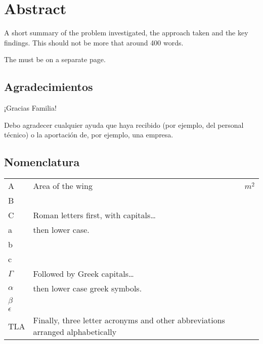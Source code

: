 \documentclass[a4paper,oneside,12pt]{book}
\title{\thesistitle}
\author{\authorname}
\begin{document}


\chapter*{Abstract}
A short summary of the problem investigated, the approach taken and the key findings. This should not be more that around 400 words.

The must be on a separate page.


\newpage

\section*{\Huge{Agradecimientos}}
¡Gracias Familia!

Debo agradecer cualquier ayuda que haya recibido (por ejemplo, del personal técnico) o la aportación de, por ejemplo, una empresa.

\renewcommand*\contentsname{Contenido}
\renewcommand{\listfigurename}{Lista de Figuras}
\renewcommand{\listtablename}{Lista de Tablas}
\tableofcontents
\listoffigures
\listoftables
\newpage
\section*{\Huge{Nomenclatura}}
\begin{tabular}{lp{9cm}l}
A&Area of the wing&$m^{2}$\\
B\\
C& Roman letters first, with capitals\ldots\\
a&then lower case.\\
b\\
c\\
$\Gamma$&Followed by Greek capitals\ldots\\
$\alpha$&then lower case greek symbols.\\
$\beta$\\
$\epsilon$\\
TLA&Finally, three letter acronyms and other abbreviations arranged alphabetically\\
\end{tabular}
\vspace{2cm}

\mainmatter
%





\renewcommand{\bibname}{Referencias Bibliográficas}

\appendix
\renewcommand{\thechapter}{A\arabic{chapter}}

\end{document}
